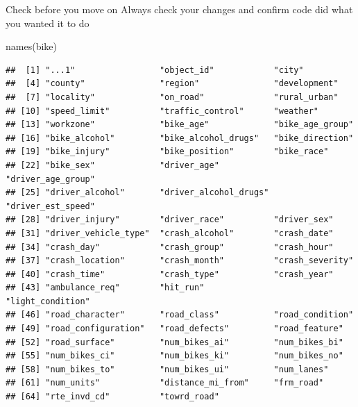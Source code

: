 \documentclass[
  ignorenonframetext,
]{beamer}
\newenvironment{Shaded}{\begin{snugshade}}{\end{snugshade}}
\newcommand{\FunctionTok}[1]{\textcolor[rgb]{0.00,0.00,0.00}{#1}}
\newcommand{\NormalTok}[1]{#1}
\begin{document}
\begin{frame}[fragile]{Check before you move on}
\protect\hypertarget{check-before-you-move-on-1}{}
Always check your changes and confirm code did what you wanted it to do

\begin{Shaded}
\begin{Highlighting}[]
\FunctionTok{names}\NormalTok{(bike)}
\end{Highlighting}
\end{Shaded}

\begin{verbatim}
##  [1] "...1"                 "object_id"            "city"                
##  [4] "county"               "region"               "development"         
##  [7] "locality"             "on_road"              "rural_urban"         
## [10] "speed_limit"          "traffic_control"      "weather"             
## [13] "workzone"             "bike_age"             "bike_age_group"      
## [16] "bike_alcohol"         "bike_alcohol_drugs"   "bike_direction"      
## [19] "bike_injury"          "bike_position"        "bike_race"           
## [22] "bike_sex"             "driver_age"           "driver_age_group"    
## [25] "driver_alcohol"       "driver_alcohol_drugs" "driver_est_speed"    
## [28] "driver_injury"        "driver_race"          "driver_sex"          
## [31] "driver_vehicle_type"  "crash_alcohol"        "crash_date"          
## [34] "crash_day"            "crash_group"          "crash_hour"          
## [37] "crash_location"       "crash_month"          "crash_severity"      
## [40] "crash_time"           "crash_type"           "crash_year"          
## [43] "ambulance_req"        "hit_run"              "light_condition"     
## [46] "road_character"       "road_class"           "road_condition"      
## [49] "road_configuration"   "road_defects"         "road_feature"        
## [52] "road_surface"         "num_bikes_ai"         "num_bikes_bi"        
## [55] "num_bikes_ci"         "num_bikes_ki"         "num_bikes_no"        
## [58] "num_bikes_to"         "num_bikes_ui"         "num_lanes"           
## [61] "num_units"            "distance_mi_from"     "frm_road"            
## [64] "rte_invd_cd"          "towrd_road"
\end{verbatim}
\end{frame}
\end{document}
